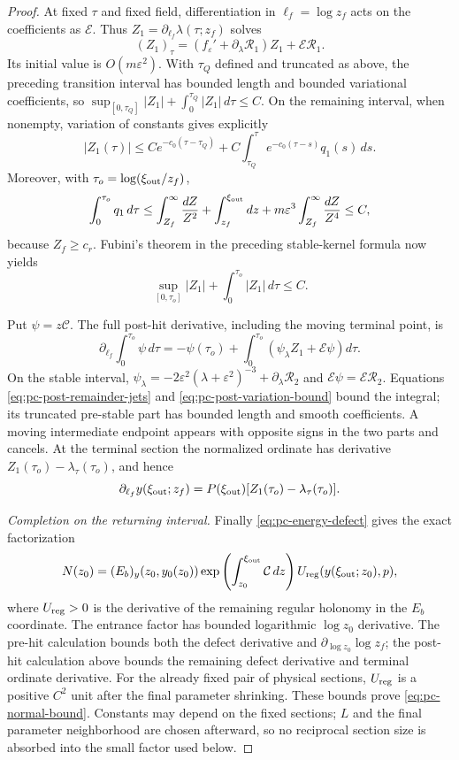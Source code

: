 \begin{proof}
At fixed $\tau$ and fixed field, differentiation in
$\ell_f=\log z_f$ acts on the coefficients as $\mathcal E$. Thus
$Z_1=\partial_{\ell_f}\lambda(\tau;z_f)$ solves
\[
 (Z_1)_\tau=(f_\varepsilon'+\partial_\lambda\mathcal R_1)Z_1
                    +\mathcal E\mathcal R_1.
\]
Its initial value is $O(m\varepsilon^2)$. With $\tau_Q$ defined and
truncated as above, the preceding transition interval has bounded length and bounded
variational coefficients, so
$\sup_{[0,\tau_Q]}|Z_1|+\int_0^{\tau_Q}|Z_1|\,d\tau\le C$.
On the remaining interval, when nonempty, variation of constants
gives explicitly
\[
 |Z_1(\tau)|\le Ce^{-c_0(\tau-\tau_Q)}
   +C\int_{\tau_Q}^{\tau}e^{-c_0(\tau-s)}q_1(s)\,ds.
\]
Moreover, with $\tau_o=\log(\xi_{\rm out}/z_f)$,
\[
 \int_0^{\tau_o}q_1\,d\tau
 \le \int_{Z_f}^{\infty}\frac{dZ}{Z^2}
      +\int_{z_f}^{\xi_{\rm out}}dz
      +m\varepsilon^3\int_{Z_f}^{\infty}\frac{dZ}{Z^4}\le C,
\]
because $Z_f\ge c_r$.  Fubini's theorem in the preceding stable-kernel
formula now yields
\begin{equation}\label{eq:pc-post-variation-bound}
 \sup_{[0,\tau_o]}|Z_1|+\int_0^{\tau_o}|Z_1|\,d\tau\le C.
\end{equation}

Put $\psi=z\mathcal C$. The full post-hit derivative, including
the moving terminal point, is
\[
 \partial_{\ell_f}\int_0^{\tau_o}\psi\,d\tau
 =-\psi(\tau_o)+\int_0^{\tau_o}
              (\psi_\lambda Z_1+\mathcal E\psi)d\tau.
\]
On the stable interval,
$\psi_\lambda=-2\varepsilon^2(\lambda+\varepsilon^2)^{-3}
+\partial_\lambda\mathcal R_2$ and
$\mathcal E\psi=\mathcal E\mathcal R_2$.
Equations \eqref{eq:pc-post-remainder-jets} and
\eqref{eq:pc-post-variation-bound} bound the integral; its truncated
pre-stable part has bounded length and smooth coefficients. A moving intermediate
endpoint appears with opposite signs in the two parts and cancels.
At the terminal section the normalized ordinate has derivative
$Z_1(\tau_o)-\lambda_\tau(\tau_o)$, and hence
\[
 \partial_{\ell_f}y(\xi_{\rm out};z_f)
 =P(\xi_{\rm out})[Z_1(\tau_o)-\lambda_\tau(\tau_o)].
\]

\medskip\noindent\textit{Completion on the returning interval.}\quad
Finally \eqref{eq:pc-energy-defect} gives the exact factorization
\[
 N(z_0)=(E_b)_y(z_0,y_0(z_0))
  \exp\left(\int_{z_0}^{\xi_{\rm out}}\mathcal C\,dz\right)
  U_{\rm reg}(y(\xi_{\rm out};z_0),p),
\]
where $U_{\rm reg}>0$ is the derivative of the remaining regular
holonomy in the $E_b$ coordinate.  The entrance factor has bounded
logarithmic $\log z_0$ derivative.  The pre-hit calculation bounds both
the defect derivative and $\partial_{\log z_0}\log z_f$; the post-hit
calculation above bounds the remaining defect derivative and terminal
ordinate derivative.  For the already fixed pair of physical sections,
$U_{\rm reg}$ is a positive $C^2$ unit after the final parameter
shrinking.  These bounds prove \eqref{eq:pc-normal-bound}.  Constants may
depend on the fixed sections; $L$ and the final parameter neighborhood
are chosen afterward, so no reciprocal section size is absorbed into
the small factor used below.


\end{proof}
